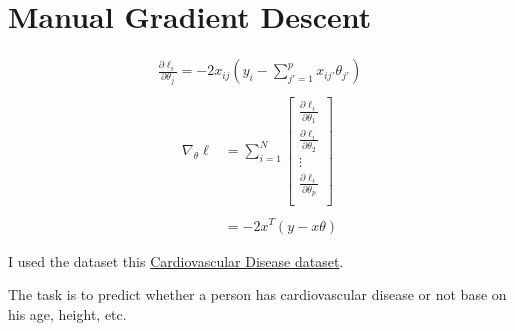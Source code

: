 \newcommand\chapternumber{3}

\usepackage{enumerate}
\usepackage{float}



\section{Manual Gradient Descent}
\begin{align*}
    \frac{\partial \ell_i}{\partial \theta_j} = -2 x_{ij} (y_i - \sum_{j'=1}^{p} x_{ij'} \theta_{j'})\\
\end{align*}
\begin{align*}
    \nabla_{\theta} \ell &= \sum_{i=1}^{N} \begin{bmatrix}
        \frac{\partial \ell_i}{\partial \theta_1} \\
        \frac{\partial \ell_i}{\partial \theta_2} \\
        \vdots \\
        \frac{\partial \ell_i}{\partial \theta_p} \\
    \end{bmatrix}\\\\
    &= -2 x^T (y-x\theta)
\end{align*}

I used the dataset this \href{https://www.kaggle.com/sulianova/cardiovascular-disease-dataset}{Cardiovascular Disease dataset}.

The task is to predict whether a person has cardiovascular disease or not base on his age, height, etc.



